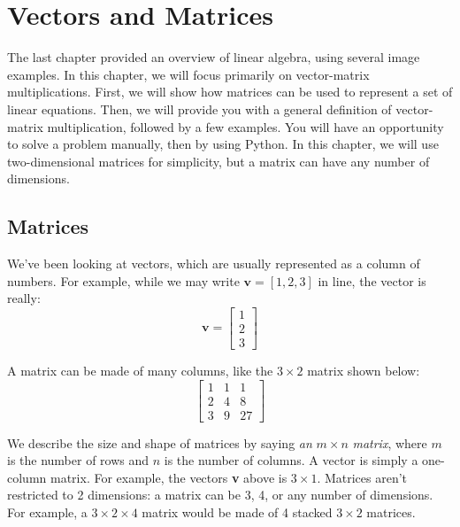 \chapter{Vectors and Matrices}

The last chapter provided an overview of linear algebra, using several image
examples. In this chapter, we will focus primarily on vector-matrix
multiplications. First, we will show how matrices can be used to represent a
set of linear equations. Then, we will provide you with a general definition
of vector-matrix multiplication, followed by a few examples. You will have an
opportunity to solve a problem manually, then by using Python. In this
chapter, we will use two-dimensional matrices for simplicity, but a matrix can
have any number of dimensions.

\section{Matrices}
We've been looking at vectors, which are usually represented as a column of
numbers. For example, while we may write $\mathbf{v} = \left[ 1, 2, 3 \right]$
in line, the vector is really:
$$\mathbf{v} = \begin{bmatrix}
1\\
2\\
3
\end{bmatrix}$$

A matrix can be made of many columns, like the $3 \times 2$ matrix shown below:
$$\begin{bmatrix}
1 & 1 & 1\\
2 & 4 & 8\\
3 & 9 & 27
\end{bmatrix}$$

We describe the size and shape of matrices by saying \textit{an }$m \times
n$\textit{ matrix}, where $m$ is the number of rows and $n$ is the number of
columns. A vector is simply a one-column matrix. For example, the vectors
\textbf{v} above is $3 \times 1$. Matrices aren't restricted to 2 dimensions:
a matrix can be 3, 4, or any number of dimensions. For example, a $3 \times 2
\times 4$ matrix would be made of 4 stacked $3 \times 2$ matrices.

